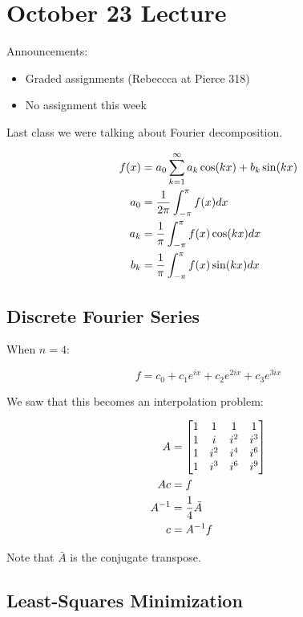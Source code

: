 \section{October 23 Lecture}

Announcements:

\begin{itemize}
  \item Graded assignments (Rebeccca at Pierce 318)
  \item No assignment this week
\end{itemize}

Last class we were talking about Fourier decomposition.

\begin{align*}
  f(x) &= a_0 \sum_{k=1}^\infty a_k \cos(kx) + b_k \sin(kx)\\
  a_0 &= {1 \over 2\pi} \int_{-\pi}^\pi f(x) dx\\
  a_k &= {1 \over \pi} \int_{-\pi}^\pi f(x) \cos(kx) dx\\
  b_k &= {1 \over \pi} \int_{-\pi}^\pi f(x) \sin(kx) dx
\end{align*}

\subsection{Discrete Fourier Series}

When $n=4$:

\[
  f = c_0 + c_1 e^{ix} + c_2 e^{2ix} + c_3 e^{3ix}
\]

We saw that this becomes an interpolation problem:

\begin{align*}
  A &= \begin{bmatrix}
    1 & 1 & 1 & 1 \\
    1 & i & i^2 & i^3 \\
    1 & i^2 & i^4 & i^6 \\
    1 & i^3 & i^6 & i^9 \\    
  \end{bmatrix}\\
  Ac &= f\\
  A^{-1} &= {1\over4} \bar{A}\\
  c &= A^{-1}f
\end{align*}

Note that $\bar{A}$ is the conjugate transpose.

\subsection{Least-Squares Minimization}

